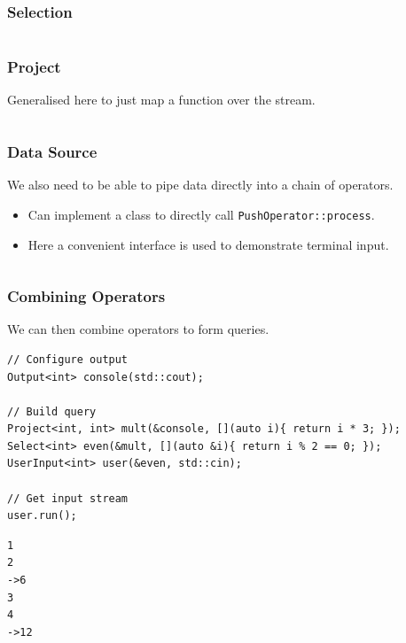 \subsubsection{Selection}
\inputminted{cpp}{streams/code/streams/operators/select.h}
\subsubsection{Project}
Generalised here to just map a function over the stream.
\inputminted{cpp}{streams/code/streams/operators/project.h}

\subsubsection{Data Source}
We also need to be able to pipe data directly into a chain of operators.
\begin{itemize}
    \item Can implement a class to directly call \texttt{PushOperator::process}.
    \item Here a convenient interface is used to demonstrate terminal input.
\end{itemize}
\inputminted{cpp}{streams/code/streams/operators/source.h}

\subsubsection{Combining Operators}
We can then combine operators to form queries.
\begin{verbatim}
// Configure output
Output<int> console(std::cout);

// Build query
Project<int, int> mult(&console, [](auto i){ return i * 3; });
Select<int> even(&mult, [](auto &i){ return i % 2 == 0; });
UserInput<int> user(&even, std::cin);

// Get input stream
user.run();
\end{verbatim}
\begin{verbatim}
1
2
->6
3
4
->12
\end{verbatim}

